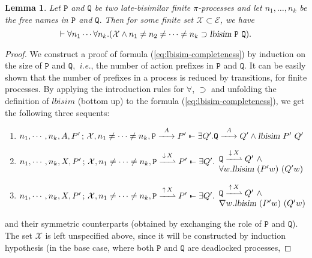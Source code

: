 \documentclass{acmtrans2m}
\newtheorem{lemma}[theorem]{Lemma}
\newcommand{\ie}{{\em i.e.}}
\def\Escr{{\mathcal E}}
\def\Xscr{{\mathcal X}}
\def\Ppi{{\mathtt P}}
\def\Qpi{{\mathtt Q}}
\def\relbar{\mathrel{\smash-}}
\def\joinrelm{\mathrel{\mkern-3.2mu}}
\def\tailpiece{\kern 1pt\vrule height 1ex width 0.3ex depth -.25ex}
\def\seqsym{\mathrel{\tailpiece\joinrelm\relbar}}
\newcommand{\NSeq}[3]{#1\,;\,#2 \seqsym #3}
\newcommand{\lbisim}[2]{\hbox{\sl lbisim}~#1~#2}
\newcommand{\inact}{\mathop{\downarrow}}
\newcommand{\oimp}{\supset}
\newcommand{\one  }[3]{#1\stackrel{#2}{-\!\!-\!\!\!\rightarrow    } #3}
\newcommand{\onep }[3]{#1\stackrel{#2}{-\!\!-\!\!\!\rightharpoonup} #3}
\newcommand{\outact}{\mathop{\uparrow}}
\begin{document}
\begin{lemma}
\label{lm:lbisim-complete}
Let $\Ppi$ and $\Qpi$ be two late-bisimilar finite $\pi$-processes and let
$n_1, \ldots, n_k$ be the free names in $\Ppi$ and $\Qpi.$
Then for some finite set $\Xscr \subset \Escr$, we have
\begin{equation}
\vdash \forall n_1 \cdots \forall n_k. (\Xscr \land n_1 \not = n_2 \not = \cdots \not = n_k \oimp \lbisim \Ppi \Qpi).
\label{eq:lbisim-completeness}
\end{equation}
\end{lemma}
\begin{proof}
We construct a proof of formula (\ref{eq:lbisim-completeness}) by induction on the size of
$\Ppi$ and $\Qpi,$ \ie, the number of action prefixes in $\Ppi$ and $\Qpi.$ 
It can be easily shown that the number of prefixes in a process is reduced
by transitions, for finite processes. 
By applying the introduction rules
for $\forall$, $\oimp$ and unfolding the definition of $lbisim$ (bottom up) 
to the formula (\ref{eq:lbisim-completeness}), we get the following three sequents:
\begin{enumerate}
\item $\NSeq{n_1, \cdots, n_k, A, P'}{\Xscr, n_1 \not = \cdots \not = n_k, \one{\Ppi}{A}{P'}}
           {\exists Q'. \one {\Qpi}{A}{Q'} \land \lbisim{P'}{Q'}}$
\item $\NSeq{n_1, \cdots, n_k, X, P'}{\Xscr, n_1 \not = \cdots \not = n_k, \onep{\Ppi}{\inact X}{P'}}
           {\exists Q'. 
             \begin{array}{l}
              \onep {\Qpi}{\inact X}{Q'} ~ \land \\
               \forall w. \lbisim{(P'w)}{(Q'w)}
             \end{array}
           }$
\item $\NSeq{n_1, \cdots, n_k, X, P'}{\Xscr, n_1 \not = \cdots \not = n_k, \onep{\Ppi}{\outact X}{P'}}
           {\exists Q'. 
             \begin{array}{l}
              \onep {\Qpi}{\outact X}{Q'} ~ \land  \\
              \nabla w. \lbisim{(P'w)}{(Q'w)}
             \end{array}
           }$
\end{enumerate}
and their symmetric counterparts (obtained by exchanging the role of $\Ppi$ and $\Qpi$).
The set $\Xscr$ is left unspecified above, since it will be constructed by induction
hypothesis (in the base case, where both $\Ppi$ and $\Qpi$ are deadlocked processes, 

\end{proof}
\end{document}
